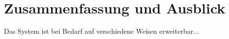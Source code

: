 \chapter{\label{chap:fazit}Zusammenfassung und Ausblick}
%
%
Das System ist bei Bedarf auf verschiedene Weisen erweiterbar...